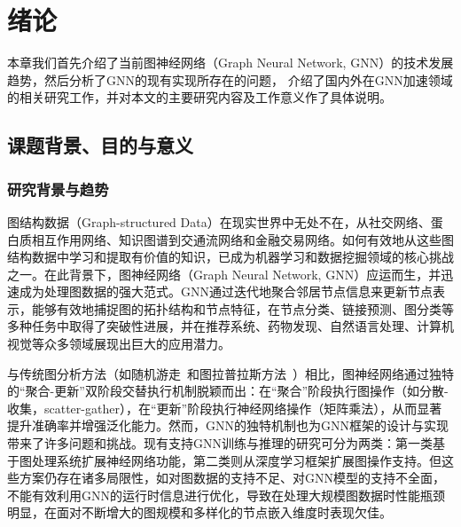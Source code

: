 \section{绪\hspace{1em}论}

本章我们首先介绍了当前图神经网络（Graph Neural Network, GNN）的技术发展趋势，然后分析了GNN的现有实现所存在的问题，
介绍了国内外在GNN加速领域的相关研究工作，并对本文的主要研究内容及工作意义作了具体说明。
\subsection{课题背景、目的与意义}

\subsubsection{研究背景与趋势}
图结构数据（Graph-structured Data）在现实世界中无处不在，从社交网络、蛋白质相互作用网络、知识图谱到交通流网络和金融交易网络。如何有效地从这些图结构数据中学习和提取有价值的知识，已成为机器学习和数据挖掘领域的核心挑战之一。在此背景下，图神经网络（Graph Neural Network, GNN）应运而生，并迅速成为处理图数据的强大范式。GNN通过迭代地聚合邻居节点信息来更新节点表示，能够有效地捕捉图的拓扑结构和节点特征，在节点分类、链接预测、图分类等多种任务中取得了突破性进展，并在推荐系统、药物发现、自然语言处理、计算机视觉等众多领域展现出巨大的应用潜力。

与传统图分析方法（如随机游走~\cite{grover2016node2vec, deepWalk}和图拉普拉斯方法~\cite{luo2011cauchy, luo2009non}）相比，图神经网络通过独特的“聚合-更新”双阶段交替执行机制脱颖而出：在“聚合”阶段执行图操作（如分散-收集，scatter-gather），在“更新”阶段执行神经网络操作（矩阵乘法），从而显著提升准确率并增强泛化能力。然而，GNN的独特机制也为GNN框架的设计与实现带来了许多问题和挑战。现有支持GNN训练与推理的研究可分为两类：第一类基于图处理系统扩展神经网络功能，第二类则从深度学习框架扩展图操作支持。但这些方案仍存在诸多局限性，如对图数据的支持不足、对GNN模型的支持不全面，不能有效利用GNN的运行时信息进行优化，导致在处理大规模图数据时性能瓶颈明显，在面对不断增大的图规模和多样化的节点嵌入维度时表现欠佳。

